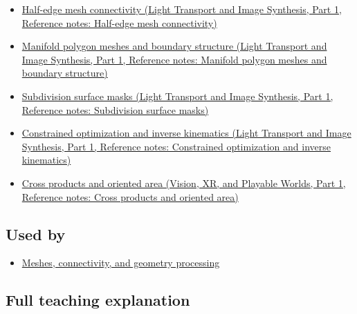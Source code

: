\hypertarget{appendix-7107009c505b-prerequisites}{}

\begin{itemize}
\tightlist
\item
  \href{../04-Light-Transport-and-Image-Synthesis-P01/main.pdf\#nameddest=appendix-1aea26b2307f}{Half-edge mesh connectivity (Light Transport and Image Synthesis, Part 1, Reference notes: Half-edge mesh connectivity)}
\item
  \href{../04-Light-Transport-and-Image-Synthesis-P01/main.pdf\#nameddest=appendix-fab348609369}{Manifold polygon meshes and boundary structure (Light Transport and Image Synthesis, Part 1, Reference notes: Manifold polygon meshes and boundary structure)}
\item
  \href{../04-Light-Transport-and-Image-Synthesis-P01/main.pdf\#nameddest=appendix-0234ab7f86b1}{Subdivision surface masks (Light Transport and Image Synthesis, Part 1, Reference notes: Subdivision surface masks)}
\item
  \href{../04-Light-Transport-and-Image-Synthesis-P01/main.pdf\#nameddest=appendix-29f4bea4c2bb}{Constrained optimization and inverse kinematics (Light Transport and Image Synthesis, Part 1, Reference notes: Constrained optimization and inverse kinematics)}
\item
  \href{../07-Vision-XR-and-Playable-Worlds-P01/main.pdf\#nameddest=appendix-2391db8052b1}{Cross products and oriented area (Vision, XR, and Playable Worlds, Part 1, Reference notes: Cross products and oriented area)}
\end{itemize}

\subsection{Used by}\label{appendix-7107009c505b-used-by}

\hypertarget{appendix-7107009c505b-used-by}{}

\begin{itemize}
\tightlist
\item
  \hyperref[03-visual-computing-i-ch002-meshes-connectivity-and-geometry-processing]{Meshes, connectivity, and geometry processing}
\end{itemize}

\subsection{Full teaching explanation}\label{appendix-7107009c505b-full-teaching-explanation}

